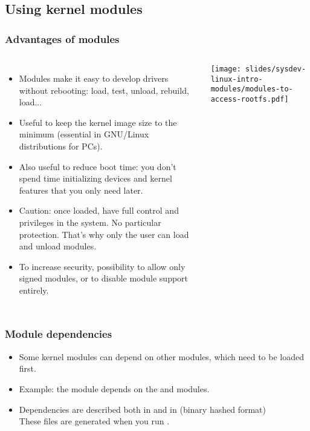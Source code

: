 \subsection{Using kernel modules}

\begin{frame}
  \frametitle{Advantages of modules}
  \begin{columns}
      \begin{itemize}
      \item Modules make it easy to develop drivers without rebooting:
        load, test, unload, rebuild, load...
      \item Useful to keep the kernel image size to the minimum (essential
        in GNU/Linux distributions for PCs).
      \item Also useful to reduce boot time: you don't spend time
        initializing devices and kernel features that you only need later.
      \item Caution: once loaded, have full control and privileges in the
        system. No particular protection. That's why only the  user
        can load and unload modules.
      \item To increase security, possibility to allow only signed modules,
        or to disable module support entirely.
      \end{itemize}
      \texttt{[image: slides/sysdev-linux-intro-modules/modules-to-access-rootfs.pdf]}
  \end{columns}
\end{frame}

\begin{frame}
  \frametitle{Module dependencies}
  \begin{itemize}
  \item Some kernel modules can depend on other modules,
    which need to be loaded first.
  \item Example: the  module depends on the
     and  modules.
  \item Dependencies are described
    both in 
    and in  (binary hashed format)\\
    These files are generated when you run .
  \end{itemize}
\end{frame}

